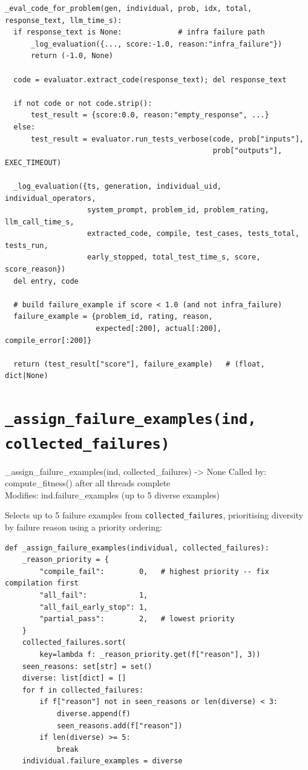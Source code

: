 \documentclass[11pt,a4paper]{report}
\newcommand{\fn}[1]{\texttt{#1}}
\begin{document}
\begin{lstlisting}[style=chain]
_eval_code_for_problem(gen, individual, prob, idx, total, response_text, llm_time_s):
  if response_text is None:             # infra failure path
      _log_evaluation({..., score:-1.0, reason:"infra_failure"})
      return (-1.0, None)

  code = evaluator.extract_code(response_text); del response_text

  if not code or not code.strip():
      test_result = {score:0.0, reason:"empty_response", ...}
  else:
      test_result = evaluator.run_tests_verbose(code, prob["inputs"],
                                                prob["outputs"], EXEC_TIMEOUT)

  _log_evaluation({ts, generation, individual_uid, individual_operators,
                   system_prompt, problem_id, problem_rating, llm_call_time_s,
                   extracted_code, compile, test_cases, tests_total, tests_run,
                   early_stopped, total_test_time_s, score, score_reason})
  del entry, code

  # build failure_example if score < 1.0 (and not infra_failure)
  failure_example = {problem_id, rating, reason,
                     expected[:200], actual[:200], compile_error[:200]}

  return (test_result["score"], failure_example)   # (float, dict|None)
\end{lstlisting}

\section{\fn{\_assign\_failure\_examples(ind, collected\_failures)}}

\begin{spec}{\_assign\_failure\_examples(ind, collected\_failures) -> None}
Called by: compute\_fitness() after all threads complete \\
Modifies: ind.failure\_examples (up to 5 diverse examples)
\end{spec}

Selects up to 5 failure examples from \fn{collected\_failures}, prioritising
diversity by failure reason using a priority ordering:

\begin{lstlisting}[style=py]
def _assign_failure_examples(individual, collected_failures):
    _reason_priority = {
        "compile_fail":        0,   # highest priority -- fix compilation first
        "all_fail":            1,
        "all_fail_early_stop": 1,
        "partial_pass":        2,   # lowest priority
    }
    collected_failures.sort(
        key=lambda f: _reason_priority.get(f["reason"], 3))
    seen_reasons: set[str] = set()
    diverse: list[dict] = []
    for f in collected_failures:
        if f["reason"] not in seen_reasons or len(diverse) < 3:
            diverse.append(f)
            seen_reasons.add(f["reason"])
        if len(diverse) >= 5:
            break
    individual.failure_examples = diverse
\end{lstlisting}
\end{document}
